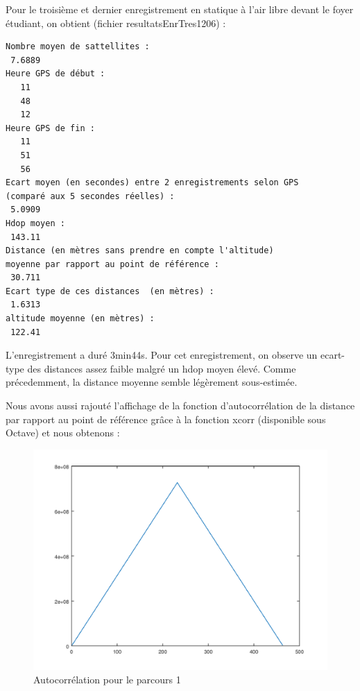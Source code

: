 \documentclass{report}
\begin{document}
Pour le troisième et dernier enregistrement en statique à l'air libre
devant le foyer étudiant, on obtient (fichier resultatsEnrTres1206) :

\begin{verbatim}
Nombre moyen de sattellites :
 7.6889
Heure GPS de début :
   11
   48
   12
Heure GPS de fin :
   11
   51
   56
Ecart moyen (en secondes) entre 2 enregistrements selon GPS 
(comparé aux 5 secondes réelles) :
 5.0909
Hdop moyen :
 143.11
Distance (en mètres sans prendre en compte l'altitude) 
moyenne par rapport au point de référence :
 30.711
Ecart type de ces distances  (en mètres) :
 1.6313
altitude moyenne (en mètres) :
 122.41
\end{verbatim}

L'enregistrement a duré 3min44s.
Pour cet enregistrement, on observe un ecart-type des distances assez
faible malgré un hdop moyen élevé. Comme précedemment, la distance
moyenne semble légèrement sous-estimée.

Nous avons aussi rajouté l'affichage de la fonction
d'autocorrélation de la distance par rapport au point
de référence grâce à la fonction xcorr (disponible
sous Octave) et nous obtenons :

\begin{figure}[H]
	\begin{center}
		\includegraphics[scale=0.5]{Enregistrements/autocorrelation1.png}
	\end{center}
	\caption{Autocorrélation pour le parcours 1}
\end{figure}
\end{document}
